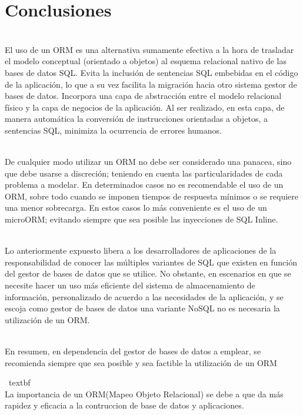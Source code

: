 \section{Conclusiones} 
\begin{flushleft}
\begin{itemize}
\textbf{}\\
El uso de un ORM es una alternativa sumamente efectiva a la hora de trasladar el modelo conceptual
(orientado a objetos) al esquema relacional nativo de las bases de datos SQL. Evita la inclusión de
sentencias SQL embebidas en el código de la aplicación, lo que a su vez facilita la migración hacia otro
sistema gestor de bases de datos. Incorpora una capa de abstracción entre el modelo relacional físico y
la capa de negocios de la aplicación. Al ser realizado, en esta capa, de manera automática la conversión
de instrucciones orientadas a objetos, a sentencias SQL, minimiza la ocurrencia de errores humanos.

\textbf{}\\
De cualquier modo utilizar un ORM no debe ser considerado una panacea, sino que debe usarse a
discreción; teniendo en cuenta las particularidades de cada problema a modelar. En determinados casos
no es recomendable el uso de un ORM, sobre todo cuando se imponen tiempos de respuesta mínimos o
se requiere una menor sobrecarga. En estos casos lo más conveniente es el uso de un microORM;
evitando siempre que sea posible las inyecciones de SQL Inline.

\textbf{}\\
Lo anteriormente expuesto libera a los desarrolladores de aplicaciones de la responsabilidad de conocer
las múltiples variantes de SQL que existen en función del gestor de bases de datos que se utilice. No
obstante, en escenarios en que se necesite hacer un uso más eficiente del sistema de almacenamiento
de información, personalizado de acuerdo a las necesidades de la aplicación, y se escoja como gestor de
bases de datos una variante NoSQL no es necesaria la utilización de un ORM. 

\textbf{}\\
En resumen, en dependencia del gestor de bases de datos a emplear, se recomienda siempre que sea
posible y sea factible la utilización de un ORM

\ textbf {} \\
La importancia  de un ORM(Mapeo Objeto Relacional) se debe a que  da más rapidez y eficacia a la contruccion de base de datos y aplicaciones.

\end{itemize} 


\end{flushleft}
